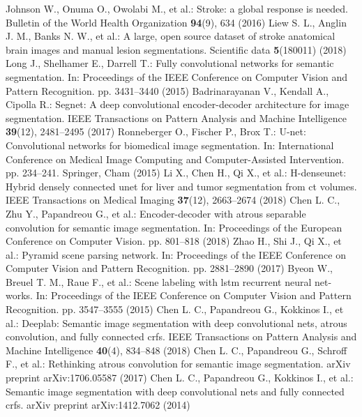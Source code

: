 \documentclass[runningheads]{llncs}
\begin{document}
\begin{thebibliography}{99}
	\bibitem{[1]}
	Johnson W., Onuma O., Owolabi M., et al.: Stroke: a global response is needed. Bulletin of the World Health Organization \textbf{94}(9), 634 (2016)
	\bibitem{[2]}
	Liew S. L., Anglin J. M., Banks N. W., et al.: A large, open source dataset of stroke anatomical brain images and manual lesion segmentations. Scientific data \textbf{5}(180011) (2018)
	\bibitem{[3]}
	Long J., Shelhamer E., Darrell T.: Fully convolutional networks for semantic segmentation. In: Proceedings of the IEEE Conference on Computer Vision and Pattern Recognition. pp. 3431--3440 (2015)
	\bibitem{[4]}
	Badrinarayanan V., Kendall A., Cipolla R.: Segnet: A deep convolutional encoder-decoder architecture for image segmentation. IEEE Transactions on Pattern Analysis and Machine Intelligence \textbf{39}(12), 2481--2495 (2017)
	\bibitem{[5]}
	Ronneberger O., Fischer P., Brox T.: U-net: Convolutional networks for biomedical image segmentation. In: International Conference on Medical Image Computing and Computer-Assisted Intervention. pp. 234--241. Springer, Cham (2015)
	\bibitem{[6]}
	Li X., Chen H., Qi X., et al.: H-denseunet: Hybrid densely connected unet for liver and tumor segmentation from ct volumes. IEEE Transactions on Medical Imaging \textbf{37}(12), 2663--2674 (2018)
	\bibitem{[7]}
	Chen L. C., Zhu Y., Papandreou G., et al.: Encoder-decoder with atrous separable convolution for semantic image segmentation. In: Proceedings of the European Conference on Computer Vision. pp. 801--818 (2018)
	\bibitem{[8]}
	Zhao H., Shi J., Qi X., et al.: Pyramid scene parsing network. In: Proceedings of the IEEE Conference on Computer Vision and Pattern Recognition. pp. 2881--2890 (2017)
	\bibitem{[9]}
	Byeon W., Breuel T. M., Raue F., et al.: Scene labeling with lstm recurrent neural net-works. In: Proceedings of the IEEE Conference on Computer Vision and Pattern Recognition. pp. 3547--3555 (2015)
	\bibitem{[10]}
	Chen L. C., Papandreou G., Kokkinos I., et al.: Deeplab: Semantic image segmentation with deep convolutional nets, atrous convolution, and fully connected crfs. IEEE Transactions on Pattern Analysis and Machine Intelligence \textbf{40}(4), 834--848 (2018)
	\bibitem{[11]} 
	Chen L. C., Papandreou G., Schroff F., et al.: Rethinking atrous convolution for semantic image segmentation. arXiv preprint arXiv:1706.05587 (2017)
	\bibitem{[12]}
	Chen L. C., Papandreou G., Kokkinos I., et al.: Semantic image segmentation with deep convolutional nets and fully connected crfs. arXiv preprint arXiv:1412.7062 (2014)
	\bibitem{[13]}

\end{thebibliography}
\end{document}
